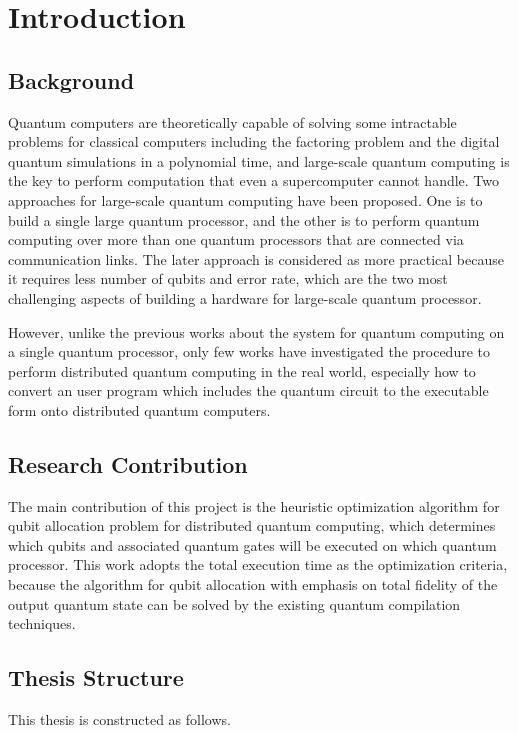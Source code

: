 \chapter{Introduction}
\label{introduction}

\section{Background}
\label{introduction:background}
 Quantum computers are theoretically capable of solving some intractable problems for classical computers including the factoring problem and the digital quantum simulations in a polynomial time, and large-scale quantum computing is the key to perform computation that even a supercomputer cannot handle.   Two approaches for large-scale quantum computing have been proposed. One is to build a single large quantum processor, and the other is to perform quantum computing over more than one quantum processors that are connected via communication links.  The later approach is considered as more practical because it requires less number of qubits and error rate, which are the two most challenging aspects of building a hardware for large-scale quantum processor.
 
 However, unlike the previous works about the system for quantum computing on a single quantum processor,  only few works have investigated the procedure to perform distributed quantum computing in the real world, especially how to convert an user program which includes the quantum circuit to the executable form onto distributed quantum computers.

\section{Research Contribution}
\label{introduction:research_contribution}
The main contribution of this project is the heuristic optimization algorithm for qubit allocation problem for distributed quantum computing, which determines which qubits and associated quantum gates will be executed on which quantum processor.  This work adopts the total execution time as the optimization criteria, because the algorithm for qubit allocation with emphasis on total fidelity of the output quantum state can be solved by the existing quantum compilation techniques.

\section{Thesis Structure}
\label{introduction:thesis_structure}
This thesis is constructed as follows.

